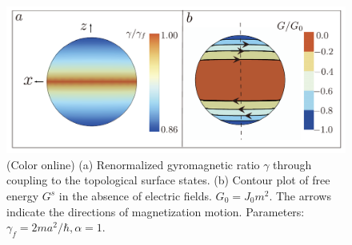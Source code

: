 \documentclass[aps,prb,twocolumn,showpacs,superscriptaddress]{revtex4-1}
\begin{document}
\begin{figure}[!htb]
\begin{center}
\includegraphics[width=3.4 in]{figure1.pdf}
\end{center} 
\caption{(Color online)  (a) Renormalized gyromagnetic ratio $\gamma$ through coupling to the topological surface states. (b) Contour plot of free energy $G^s$ in the absence of electric fields. $G_0 = J_0 m^2$.  The arrows indicate the directions of magnetization motion. Parameters: $\gamma_f = 2ma^2/\hbar, \alpha = 1$.}
\label{fig:1}
\end{figure} 
 
\end{document}
